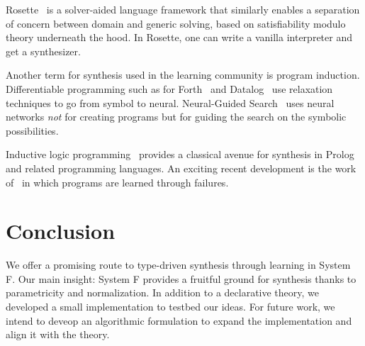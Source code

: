 \documentclass[acmsmall]{acmart}
\theoremstyle{mytheoremstyle}
\begin{document}
Rosette~\cite{rosette} is a solver-aided language framework that similarly enables a separation of concern between domain and generic solving, based on satisfiability modulo theory underneath the hood. In Rosette, one can write a vanilla interpreter and get a synthesizer.

Another term for synthesis used in the learning community is program induction.
Differentiable programming such as for Forth~\cite{dforth} and Datalog~\cite{ddatalog} use relaxation techniques to go from symbol to neural.
Neural-Guided Search~\cite{webyrd-nips,dreamcoder} uses neural networks \emph{not} for creating programs but for guiding the search on the symbolic possibilities.

Inductive logic programming~\cite{ilp} provides a classical avenue for synthesis in Prolog and related programming languages. An exciting recent development is the work of~\citet{cropper} in which programs are learned through failures.


\section{Conclusion}

We offer a promising route to type-driven synthesis through learning in System F. Our main insight: System F provides a fruitful ground for synthesis thanks to parametricity and normalization. In addition to a declarative theory, we developed a small implementation to testbed our ideas. For future work, we intend to deveop an algorithmic formulation to expand the implementation and align it with the theory.

\end{document}
